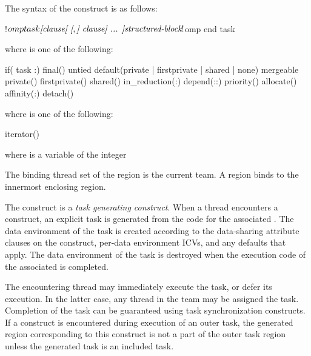 \begin{fortranspecific}
The syntax of the  construct is as follows:

\begin{ompfPragma}
!$omp task \plc{[clause[ [},\plc{] clause] ... ]}
    \plc{structured-block}
!$omp end task
\end{ompfPragma}

where  is one of the following{}:

\begin{indentedcodelist}
if(\plc{[} task :\plc{] scalar-logical-expression})
final()
untied
default(private \textnormal{|} firstprivate \textnormal{|} shared \textnormal{|} none)
mergeable
private()
firstprivate()
shared()
in_reduction(:)
depend(\plc{[depend-modifier}:\plc{][dependence-type }:\plc{] locator-list})
priority()
allocate(\plc{[allocator: ]})
affinity(\plc{[aff-modifier }:\plc{] locator-list})
detach()
\end{indentedcodelist}

where  is one of the following{}:
\begin{indentedcodelist}
iterator() 
\end{indentedcodelist}

where  is a variable of the  integer 

\end{fortranspecific}

\binding
The binding thread set of the  region is the current team. A  region binds to
the innermost enclosing  region.

\descr

The  construct is a \emph{task generating construct}. When a thread
encounters a  construct, an explicit task is generated from the code
for the associated . The data environment of the task is
created according to the data-sharing attribute clauses on the 
construct, per-data environment ICVs, and any defaults that apply. The data environment of the task is destroyed 
when the execution code of the associated  is completed.

The encountering thread may immediately execute the task, or defer its execution. In the
latter case, any thread in the team may be assigned the task. Completion of the task can
be guaranteed using task synchronization constructs.
If a  construct is encountered during execution of an outer
task, the generated  region corresponding to this construct is not a
part of the outer task region unless the generated task is
an included task.

